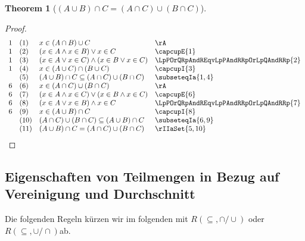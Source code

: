 \documentclass{book}
\theoremstyle{plain}
\newtheorem{theorem}{Theorem}
\theoremstyle{remark}
\theoremstyle{definition}
\begin{document}
\label{LpAcuBRpcaCEqualsLpAcaCRpcuLpBcaCRp}
\begin{theorem}[\((A \cup B)\cap C = (A \cap C) \cup (B \cap C)\)]
\end{theorem}

\begin{proof}
	\[
	\begin{array}{llll}
		1 & (1) & x \in (A \cap B)\cup C & \rA \\
		1 & (2) & (x \in A\land x\in B)\lor x\in C  & \capcupE{1} \\
		1 & (3) & (x \in A\lor x \in C)\land (x\in B\lor x\in C) & \LpPOrQRpAndREqvLpPAndRRpOrLpQAndRRp{2} \\
		1 & (4) & x\in (A\cup C)\cap (B\cup C) & \capcupI{3} \\		
		& (5) & (A \cup B)\cap C\subseteq (A\cap C)\cup (B\cap C) & \subseteqIa{1,4} \\	
		6 & (6) & x\in (A\cap C)\cup (B\cap C) & \rA \\	
		6 & (7) & (x \in A\land x \in C)\lor (x\in B\land x\in C) & \capcupE{6} \\	
		6 & (8) & (x \in A\lor x\in B)\land x\in C & \LpPOrQRpAndREqvLpPAndRRpOrLpQAndRRp{7} \\
		6 & (9) & x \in (A \cup B)\cap C & \capcupI{8} \\
		& (10) & (A\cap C)\cup (B\cap C)\subseteq (A \cup B)\cap C & \subseteqIa{6,9} \\
		& (11) & (A \cup B)\cap C = (A\cap C)\cup (B\cap C) & \rIIaSet{5,10} \\
	\end{array}
	\]
\end{proof}

\subsection{Eigenschaften von Teilmengen in Bezug auf Vereinigung und Durchschnitt}
Die folgenden Regeln kürzen wir im folgenden mit \(R(\subseteq,\cap/\cup)\) oder \(R(\subseteq,\cup/\cap)\)ab.
\end{document}
